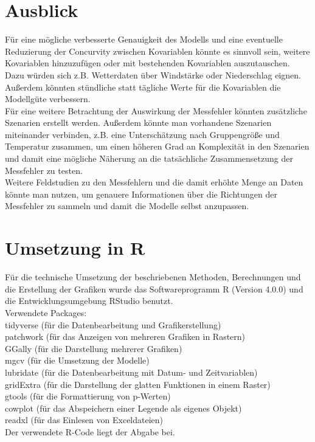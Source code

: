 \documentclass[12pt]{scrreprt}
\begin{document}
\chapter{Ausblick}
Für eine mögliche verbesserte Genauigkeit des Modells und eine eventuelle Reduzierung der Concurvity zwischen Kovariablen könnte es sinnvoll sein, weitere Kovariablen hinzuzufügen oder  mit bestehenden Kovariablen auszutauschen. Dazu würden sich z.B. Wetterdaten über Windstärke oder Niederschlag eignen. Außerdem könnten stündliche statt tägliche Werte für die Kovariablen die Modellgüte verbessern. \\
Für eine weitere Betrachtung der Auswirkung der Messfehler könnten zusätzliche Szenarien erstellt werden. Außerdem könnte man vorhandene Szenarien miteinander verbinden, z.B. eine Unterschätzung nach Gruppengröße und Temperatur zusammen, um einen höheren Grad an Komplexität in den Szenarien und damit eine mögliche Näherung an die tatsächliche Zusammensetzung der Messfehler zu testen. \\
Weitere Feldstudien zu den Messfehlern und die damit erhöhte Menge an Daten könnte man nutzen, um genauere Informationen über die Richtungen der Messfehler zu sammeln und damit die Modelle selbst anzupassen.


	

\chapter{Umsetzung in R}
Für die technische Umsetzung der beschriebenen Methoden, Berechnungen und die Erstellung der Grafiken wurde das Softwareprogramm R (Version 4.0.0) und die Entwicklungsumgebung RStudio benutzt.\\

\noindent Verwendete Packages:\\
tidyverse (für die Datenbearbeitung und Grafikerstellung) \\
patchwork (für das Anzeigen von mehreren Grafiken in Rastern) \\
GGally (für die Darstellung mehrerer Grafiken) \\
mgcv (für die Umsetzung der Modelle) \\
lubridate (für die Datenbearbeitung mit Datum- und Zeitvariablen) \\
gridExtra (für die Darstellung der glatten Funktionen in einem Raster) \\
gtools (für die Formattierung von p-Werten) \\
cowplot (für das Abspeichern einer Legende als eigenes Objekt) \\
readxl (für das Einlesen von Exceldateien) \\

\noindent Der verwendete R-Code liegt der Abgabe bei.
\end{document}
